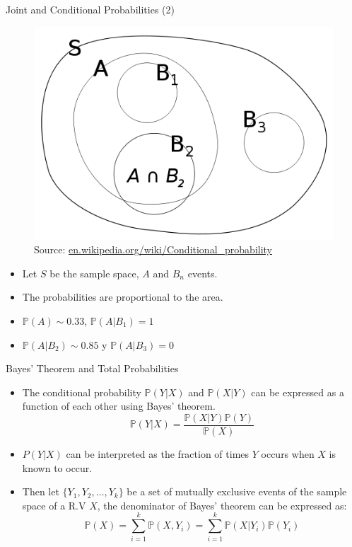 \documentclass[handout]{beamer}
\begin{document}
\begin{frame}{Joint and Conditional Probabilities (2)}
 \begin{figure}[h!]
	\centering
	\includegraphics[scale=0.3]{pics/condicional.png}
	\caption{Source: \url{en.wikipedia.org/wiki/Conditional_probability}}
\end{figure}



\scriptsize{
\begin{itemize}
 \item Let $S$ be the sample space, $A$ and $B_n$ events.
 \item The probabilities are proportional to the area.
 \item $\mathbb{P}(A) \sim 0.33$, $\mathbb{P}(A|B_1)=1$
 \item $\mathbb{P}(A|B_2)\sim 0.85$ y $\mathbb{P}(A|B_3)=0$ 
\end{itemize}




} 
\end{frame}




\begin{frame}{Bayes' Theorem and Total Probabilities}
\scriptsize{
\begin{itemize}
 \item The conditional probability $\mathbb{P}(Y|X)$ and $\mathbb{P}(X|Y)$ can be expressed as a function of each other using Bayes' theorem.
\begin{displaymath}
 \mathbb{P}(Y|X)=\frac{\mathbb{P}(X|Y)\mathbb{P}(Y)}{\mathbb{P}(X)}
\end{displaymath}
\item $P(Y|X)$ can be interpreted as the fraction of times $Y$ occurs when $X$ is known to occur.
\item Then let $\{ Y_1,Y_2,\dots, Y_k \} $ be a set of mutually exclusive events of the sample space of a R.V $X$, the denominator of Bayes' theorem can be expressed as:
\begin{displaymath}
\mathbb{P}(X)= \sum_{i=1}^{k} \mathbb{P}(X,Y_i) = \sum_{i=1}^{k} \mathbb{P}(X|Y_i)\mathbb{P}(Y_i)
\end{displaymath}
\end{itemize}
 
}
\end{frame}
\end{document}

